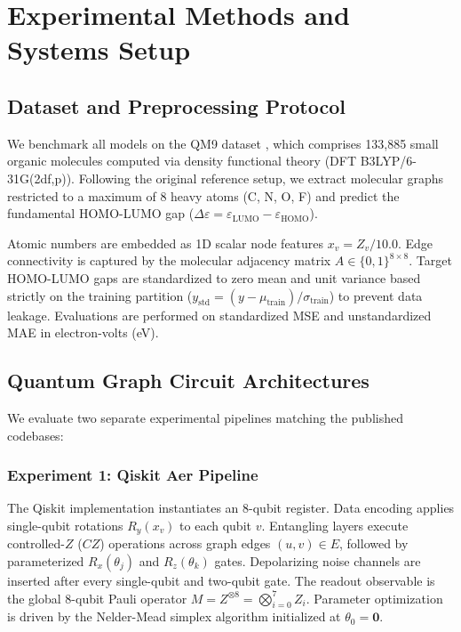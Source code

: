 \documentclass[sn-apacite,Numbered]{sn-jnl}
\begin{document}
\section{Experimental Methods and Systems Setup}\label{sec:methods}

\subsection{Dataset and Preprocessing Protocol}
We benchmark all models on the QM9 dataset \cite{ramakrishnan2014quantum}, which comprises 133,885 small organic molecules computed via density functional theory (DFT B3LYP/6-31G(2df,p)). Following the original reference setup, we extract molecular graphs restricted to a maximum of 8 heavy atoms (C, N, O, F) and predict the fundamental HOMO-LUMO gap ($\Delta \varepsilon = \varepsilon_{\text{LUMO}} - \varepsilon_{\text{HOMO}}$).

Atomic numbers are embedded as 1D scalar node features $x_v = Z_v / 10.0$. Edge connectivity is captured by the molecular adjacency matrix $A \in \{0, 1\}^{8 \times 8}$. Target HOMO-LUMO gaps are standardized to zero mean and unit variance based strictly on the training partition ($y_{\text{std}} = (y - \mu_{\text{train}}) / \sigma_{\text{train}}$) to prevent data leakage. Evaluations are performed on standardized MSE and unstandardized MAE in electron-volts (eV).

\subsection{Quantum Graph Circuit Architectures}
We evaluate two separate experimental pipelines matching the published codebases:

\subsubsection{Experiment 1: Qiskit Aer Pipeline}
The Qiskit implementation instantiates an 8-qubit register. Data encoding applies single-qubit rotations $R_y(x_v)$ to each qubit $v$. Entangling layers execute controlled-$Z$ ($CZ$) operations across graph edges $(u, v) \in E$, followed by parameterized $R_x(\theta_j)$ and $R_z(\theta_k)$ gates. Depolarizing noise channels are inserted after every single-qubit and two-qubit gate. The readout observable is the global 8-qubit Pauli operator $M = Z^{\otimes 8} = \bigotimes_{i=0}^7 Z_i$. Parameter optimization is driven by the Nelder-Mead simplex algorithm initialized at $\theta_0 = \mathbf{0}$.
\end{document}
